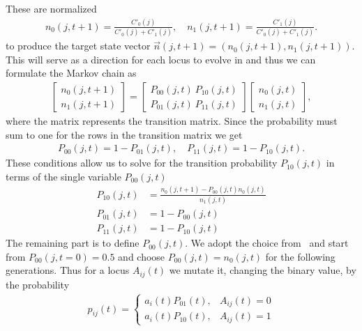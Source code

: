These are normalized
\begin{align}
  n_0(j, t+1) = \frac{C'_0(j)}{C'_0(j) + C'_1(j)}, \quad n_1(j, t+1) = \frac{C'_1(j)}{C'_0(j) + C'_1(j)}.
  \label{eq:target_states}
\end{align}
to produce the target state vector $\vec{n}(j,t+1)=(n_0(j, t+1), n_1(j, t+1))$.  This will serve as a direction for each locus to evolve in and thus we can formulate the Markov chain as
\begin{align*}
  \begin{bmatrix}
    n_0(j, t+1) \\
    n_1(j, t+1)
  \end{bmatrix}
  = 
  \begin{bmatrix}
    P_{00}(j,t) \ P_{10}(j,t) \\
    P_{01}(j,t) \ P_{11}(j,t)
  \end{bmatrix}
  \begin{bmatrix}
    n_0(j, t) \\
    n_1(j, t)
  \end{bmatrix},
\end{align*}
where the matrix represents the transition matrix. Since the probability must sum to one for the rows in the transition matrix we get 
\begin{align*}
  P_{00}(j, t) = 1 - P_{01}(j, t), \quad P_{11}(j, t) = 1 - P_{10}(j, t).
\end{align*}
These conditions allow us to solve for the transition probability $P_{10}(j,t)$ in terms of the single variable $P_{00}(j,t)$
\begin{align}
  P_{10}(j,t) &= \frac{n_0(j, t+1) - P_{00}(j,t)n_0(j, t)}{n_1(j,t)}  \label{eq:trans_prop_p10}\\
  P_{01}(j,t) &= 1 - P_{00}(j,t) \label{eq:trans_prop_p01} \\
  P_{11}(j,t) &= 1 - P_{10}(j,t) \label{eq:trans_prop_p11}
\end{align}
The remaining part is to define $P_{00}(j,t)$. We adopt the choice from~\cite{Wang2010} and start from $P_{00}(j, t = 0) = 0.5$ and choose $P_{00}(j,t) = n_0(j,t)$ for the following generations. Thus for a locus $A_{ij}(t)$ we mutate it, changing the binary value, by the probability
\begin{align}
  p_{ij}(t) = 
  \begin{cases}
    a_i(t)P_{01}(t), &A_{ij}(t) = 0 \\
    a_i(t)P_{10}(t), &A_{ij}(t) = 1
  \end{cases}
  \label{eq:p_flip}
\end{align}
